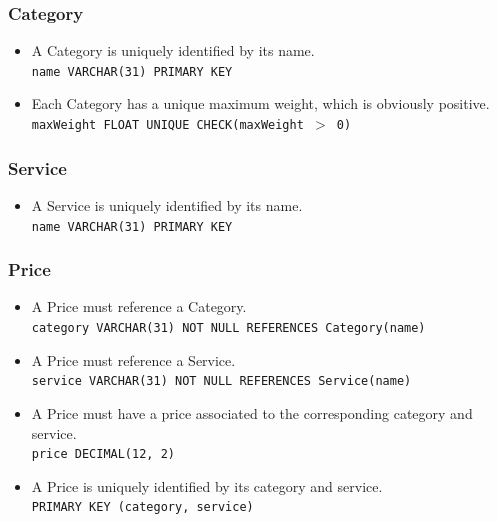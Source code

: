 \documentclass{report}[a4paper]
\theoremstyle{remark}
\begin{document}
\subsubsection{Category}
\begin{itemize}
    \item A Category is uniquely identified by its name.                                    \\ \texttt{name VARCHAR(31) PRIMARY KEY}
    \item Each Category has a unique maximum weight, which is obviously positive.           \\ \texttt{maxWeight FLOAT UNIQUE CHECK(maxWeight $>$ 0)}
\end{itemize}
\subsubsection{Service}
\begin{itemize}
    \item A Service is uniquely identified by its name.                                     \\ \texttt{name VARCHAR(31) PRIMARY KEY}
\end{itemize}
\subsubsection{Price}
\begin{itemize}
    \item A Price must reference a Category.                                                            \\ \texttt{category VARCHAR(31) NOT NULL REFERENCES Category(name)}
    \item A Price must reference a Service.                                                             \\ \texttt{service VARCHAR(31) NOT NULL REFERENCES Service(name)}
    \item A Price must have a price associated to the corresponding category and service.               \\ \texttt{price DECIMAL(12, 2)}
    \item A Price is uniquely identified by its category and service.                                   \\ \texttt{PRIMARY KEY (category, service)}
\end{itemize}
\end{document}
